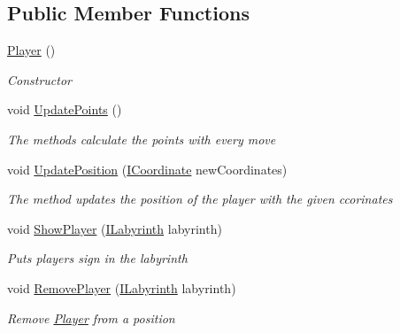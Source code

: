 \subsection*{Public Member Functions}
\begin{DoxyCompactItemize}
\item 
\hyperlink{class_labyrinth_game_1_1_player_a7d499ce5268336b48d35fc7ba4d10282}{Player} ()
\begin{DoxyCompactList}\small\item\em Constructor \end{DoxyCompactList}\item 
void \hyperlink{class_labyrinth_game_1_1_player_afd1b29af63a3d8b35232e0351be66ec7}{Update\+Points} ()
\begin{DoxyCompactList}\small\item\em The methods calculate the points with every move \end{DoxyCompactList}\item 
void \hyperlink{class_labyrinth_game_1_1_player_a17d185d5d645ca708341a8edda507b39}{Update\+Position} (\hyperlink{interface_labyrinth_game_1_1_interfaces_1_1_i_coordinate}{I\+Coordinate} new\+Coordinates)
\begin{DoxyCompactList}\small\item\em The method updates the position of the player with the given ccorinates \end{DoxyCompactList}\item 
void \hyperlink{class_labyrinth_game_1_1_player_a26d87cb40ba995b3c5a6367f14916b4e}{Show\+Player} (\hyperlink{interface_labyrinth_game_1_1_interfaces_1_1_i_labyrinth}{I\+Labyrinth} labyrinth)
\begin{DoxyCompactList}\small\item\em Puts players sign in the labyrinth \end{DoxyCompactList}\item 
void \hyperlink{class_labyrinth_game_1_1_player_ae995caf4d9b284a112e7b6af8951b647}{Remove\+Player} (\hyperlink{interface_labyrinth_game_1_1_interfaces_1_1_i_labyrinth}{I\+Labyrinth} labyrinth)
\begin{DoxyCompactList}\small\item\em Remove \hyperlink{class_labyrinth_game_1_1_player}{Player} from a position \end{DoxyCompactList}\end{DoxyCompactItemize}
